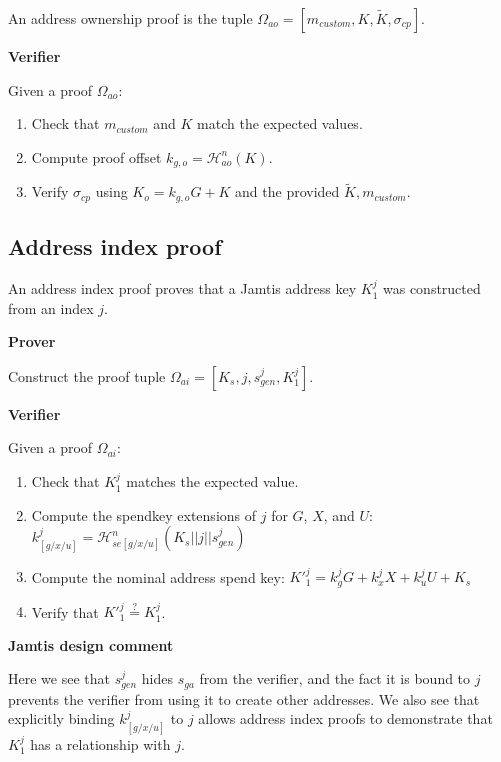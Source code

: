 \begin{appendices}
An address ownership proof is the tuple $\Omega_{ao} = [m_{custom}, K, \tilde{K}, \sigma_{cp}]$.

\textbf{Verifier}

Given a proof $\Omega_{ao}$:
\begin{enumerate}
    \item Check that $m_{custom}$ and $K$ match the expected values.

    \item Compute proof offset $k_{g, o} = \mathcal{H}^n_{ao}(K)$.

    \item Verify $\sigma_{cp}$ using $K_o = k_{g, o} G + K$ and the provided $\tilde{K}, m_{custom}$.
\end{enumerate}


\subsection{Address index proof}
\label{appendix:jamtis-information-proofs-address-index}

An address index proof proves that a Jamtis address key $K^j_1$ was constructed from an index $j$.

\textbf{Prover}

Construct the proof tuple $\Omega_{ai} = [K_s, j, s^j_{gen}, K^j_1]$.

\textbf{Verifier}

Given a proof $\Omega_{ai}$:

\begin{enumerate}
    \item Check that $K^j_1$ matches the expected value.

    \item Compute the spendkey extensions of $j$ for $G$, $X$, and $U$: $k^{j}_{[g/x/u]} = \mathcal{H}^n_{se[g/x/u]}(K_s || j || s^{j}_{gen})$

    \item Compute the nominal address spend key: $K'^{j}_1 = k^{j}_g G + k^{j}_x X + k^{j}_u U + K_s$

    \item Verify that $K'^j_1 \stackrel{?}{=} K^j_1$.
\end{enumerate}

\textbf{Jamtis design comment}

Here we see that $s^j_{gen}$ hides $s_{ga}$ from the verifier, and the fact it is bound to $j$ prevents the verifier from using it to create other addresses. We also see that explicitly binding $k^{j}_{[g/x/u]}$ to $j$ allows address index proofs to demonstrate that $K^j_1$ has a relationship with $j$.


\end{appendices}
